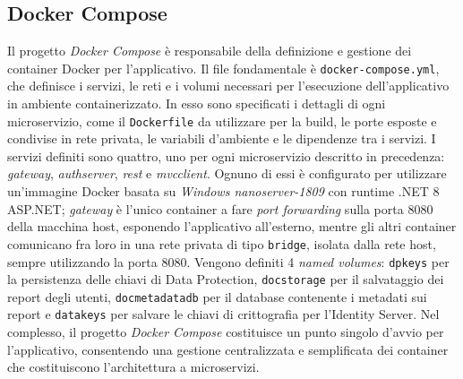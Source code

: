 \subsection{Docker Compose}
Il progetto \emph{Docker Compose} è responsabile della definizione e gestione dei container Docker per l'applicativo.
Il file fondamentale è \texttt{docker-compose.yml}, che definisce i servizi, le reti e i volumi necessari per l'esecuzione dell'applicativo in ambiente containerizzato. In esso sono specificati i dettagli di ogni microservizio, come il \texttt{Dockerfile} da utilizzare per la build, le porte esposte e condivise in rete privata, le variabili d'ambiente e le dipendenze tra i servizi.
I servizi definiti sono quattro, uno per ogni microservizio descritto in precedenza: \emph{gateway}, \emph{authserver}, \emph{rest} e \emph{mvcclient}.
Ognuno di essi è configurato per utilizzare un'immagine Docker basata su \emph{Windows nanoserver-1809} con runtime .NET 8 ASP.NET; \emph{gateway} è l'unico container a fare \emph{port forwarding} sulla porta 8080 della macchina host, esponendo l'applicativo all'esterno, mentre gli altri container comunicano fra loro in una rete privata di tipo \texttt{bridge}, isolata dalla rete host, sempre utilizzando la porta 8080.
Vengono definiti 4 \emph{named volumes}: \texttt{dpkeys} per la persistenza delle chiavi di Data Protection, \texttt{docstorage} per il salvataggio dei report degli utenti, \texttt{docmetadatadb} per il database contenente i metadati sui report e \texttt{datakeys} per salvare le chiavi di crittografia per l'Identity Server.
Nel complesso, il progetto \emph{Docker Compose} costituisce un punto singolo d'avvio per l'applicativo, consentendo una gestione centralizzata e semplificata dei container che costituiscono l'architettura a microservizi.